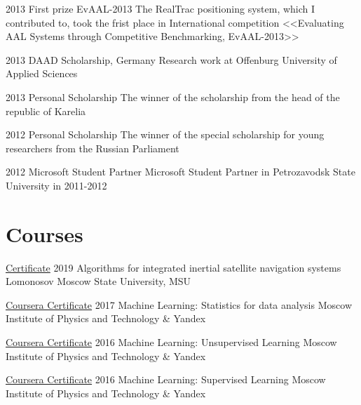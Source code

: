 \documentclass{tccv}
\begin{document}
\begin{eventlist}
\begin{yearlist}
\end{yearlist}

\begin{yearlist}
\item{2013}
     {First prize EvAAL-2013}
     {The RealTrac positioning system, which I contributed to, took the frist place in International competition <<Evaluating AAL Systems through Competitive Benchmarking, EvAAL-2013>>}

\item{2013}
     {DAAD Scholarship, Germany}
     {Research work at Offenburg University of Applied Sciences}

\item{2013}
     {Personal Scholarship}
     {The winner of the scholarship from the head of the republic of Karelia}

\item{2012}
     {Personal Scholarship}
     {The winner of the special scholarship for young researchers from the Russian Parliament}

\item{2012}
     {Microsoft Student Partner}
     {Microsoft Student Partner in Petrozavodsk State University in 2011-2012}
\end{yearlist}

\section{Courses}

\begin{yearlist}

\item[\href{https://www.dropbox.com/s/116ku7br2kqn5nr/doc00422820191224182244.pdf}{Certificate}]{2019}
     {Algorithms for integrated inertial satellite navigation systems}
     {Lomonosov Moscow State University, MSU}

\item[\href{https://www.coursera.org/account/accomplishments/records/PJCQYC92YUSU}{Coursera Certificate}]{2017}
     {Machine Learning: Statistics for data analysis}
     {Moscow Institute of Physics and Technology \& Yandex}

\item[\href{https://www.coursera.org/account/accomplishments/records/2MZW385H2Y2U}{Coursera Certificate}]{2016}
     {Machine Learning: Unsupervised Learning}
     {Moscow Institute of Physics and Technology \& Yandex}
     
\item[\href{https://www.coursera.org/account/accomplishments/records/UFDJLATYB83T}{Coursera Certificate}]{2016}
     {Machine Learning: Supervised Learning}
     {Moscow Institute of Physics and Technology \& Yandex}


\end{yearlist}
\end{eventlist}
\end{document}
